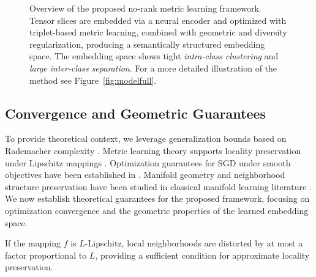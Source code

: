 \documentclass[a4paper,12pt,reqno]{amsart}
\theoremstyle{definition}
\theoremstyle{remark}
\begin{document}
\begin{figure}[t]
{
		}
		\caption{Overview of the proposed no-rank metric learning framework. Tensor slices are embedded via a neural encoder and optimized with triplet-based metric learning, combined with geometric and diversity regularization, producing a semantically structured embedding space. The embedding space shows tight \textit{intra-class clustering} and \textit{large inter-class separation}. For a more detailed illustration of the method see Figure~\ref{fig:modelfull}.}
		\label{fig:method}
	\end{figure}
	







\subsection{Convergence and Geometric Guarantees}
To provide theoretical context, we leverage generalization bounds based on Rademacher complexity \cite{shalev2014understanding, mohri2018foundations}.
	Metric learning theory supports locality preservation under Lipschitz mappings \cite{weinberger2005distance}.
	Optimization guarantees for SGD under smooth objectives have been established in \cite{bottou2018optimization, lee2016gradient}.
	Manifold geometry and neighborhood structure preservation have been studied in classical manifold learning literature \cite{hein2007graph, tenenbaum2000global}. We now establish theoretical guarantees for the proposed framework, focusing on optimization convergence and the geometric properties of the learned embedding space.


If the mapping $f$ is $L$-Lipschitz, local neighborhoods are distorted by at most a factor proportional to $L$, providing a sufficient condition for approximate locality preservation.
\end{document}
